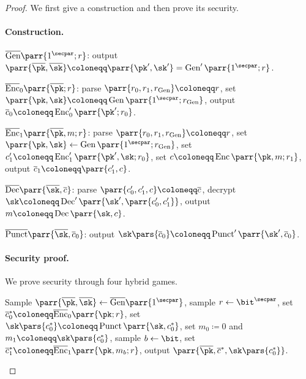 \begin{proof}
    We first give a construction and then prove its security.
    \paragraph{Construction.}
    \begin{sitemize}
        \item \(\overline{\Gen}\parr{1^\secpar;r}\):
        output \(\parr{\overline{\pk},\overline{\sk}} \coloneqq \parr{\pk',\sk'} = \Gen'\parr{1^\secpar;r}\).

        \item \(\overline{\Enc}_0\parr{\overline{\pk};r}\):
        parse \(\parr{r_0,r_1,r_{\Gen}} \coloneqq r\),
        set \(\parr{\pk,\sk} \coloneqq \Gen\parr{1^\secpar;r_{\Gen}}\),
        output \(\overline{c}_0 \coloneqq \Enc'_0\parr{\pk';r_0}\).

        \item \(\overline{\Enc}_1\parr{\overline{\pk},m;r}\):
        parse \(\parr{r_0,r_1,r_{\Gen}} \coloneqq r\),
        set \(\parr{\pk,\sk} \gets \Gen\parr{1^\secpar;r_{\Gen}}\),
        set \(c'_1 \coloneqq \Enc'_1\parr{\pk',\sk;r_0}\),
        set \(c \coloneqq \Enc\parr{\pk,m;r_1}\),
        output \(\overline{c}_1 \coloneqq \parr{c'_1,c}\).

        \item \(\overline{\Dec}\parr{\overline{\sk},\overline{c}}\):
        parse \(\parr{c'_0,c'_1,c} \coloneqq \overline{c}\),
        decrypt \(\sk \coloneqq \Dec'\parr{\sk',\parr{c'_0,c'_1}}\),
        output \(m \coloneqq \Dec\parr{\sk,c}\).

        \item \(\overline{\Punct}\parr{\overline{\sk},\overline{c}_0}\):
        output \(\sk\pars{\overline{c}_0} \coloneqq \Punct'\parr{\sk',\overline{c}_0}\).
    \end{sitemize}

    \paragraph{Security proof.}
    We prove security through four hybrid games.
    \begin{hybrids}
        \item Sample \(\parr{\overline{\pk},\overline{\sk}} \gets \overline{\Gen}\parr{1^\secpar}\),
        sample \(r \gets \bit^\secpar\),
        set \(\overline{c}^*_0 \coloneqq \overline{\Enc}_0\parr{\pk;r}\),
        set \(\sk\pars{c^*_0} \coloneqq \Punct\parr{\sk,c^*_0}\),
        set \(m_0 \coloneqq 0\) and \(m_1 \coloneqq \sk\pars{c^*_0}\),
        sample \(b \gets \bit\),
        set \(\overline{c}^*_1 \coloneqq \overline{\Enc}_1\parr{\pk,m_b;r}\),
        output \(\parr{\overline{\pk},\overline{c}^*,\sk\pars{c^*_0}}\).


\end{hybrids}
\end{proof}
